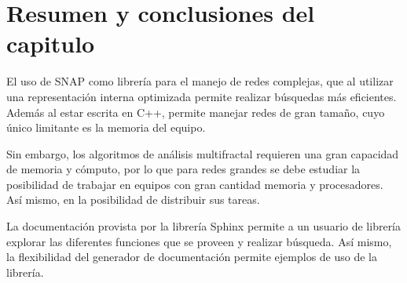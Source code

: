 \section{Resumen y conclusiones del capitulo}

El uso de SNAP como librería para el manejo de redes complejas, que al utilizar una representación interna optimizada permite realizar búsquedas más eficientes. Además al estar escrita en C++, permite manejar redes de gran tamaño, cuyo único limitante es la memoria del equipo.

Sin embargo, los algoritmos de análisis multifractal requieren una gran capacidad de memoria y cómputo, por lo que para redes grandes se debe estudiar la posibilidad de trabajar en equipos con gran cantidad memoria y procesadores. Así mismo, en la posibilidad de distribuir sus tareas.

La documentación provista por la librería Sphinx permite a un usuario de librería explorar las diferentes funciones que se proveen y realizar búsqueda. Así mismo, la flexibilidad del generador de documentación permite ejemplos de uso de la librería.